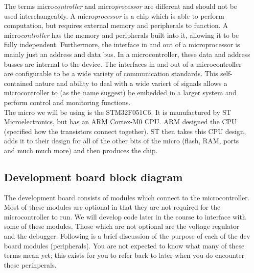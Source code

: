 \begin{table}
\caption{Comparison of specs of entry level computer to STM32F051C6.}
\label{table:specs_comp}
\end{table}

The terms micro\textit{controller} and micro\textit{processor} are different and should not be used interchangeably. A micro\textit{processor} is a chip which is able to perform computation, but requires external memory and peripherals to function. A micro\textit{controller} has the memory and peripherals built into it, allowing it to be fully independent. Furthermore, the interface in and out of a microprocessor is mainly just an address and data bus. In a microcontroller, these data and address busses are internal to the device. The interfaces in and out of a microcontroller are configurable to be a wide variety of communication standards. This self-contained nature and ability to deal with a wide variert of signals allows a microcontroller to (as the name suggest) be embedded in a larger system and perform control and monitoring functions.\\

The micro we will be using is the STM32F051C6. It is manufactured by ST Microelectronics, but has an ARM Cortex-M0 CPU. ARM designed the CPU (specified how the transistors connect together). ST then takes this CPU design, adds it to their design for all of the other bits of the micro (flash, RAM, ports and much much more) and then produces the chip.

\subsection{Development board block diagram}
The development board consists of modules which connect to the microcontroller. Most of these modules are optional in that they are not required for the microcontroller to run. We will develop code later in the course to interface with some of these modules. Those which are not optional are the voltage regulator and the debugger.
Following is a brief discussion of the purpose of each of the dev board modules (peripherals). You are not expected to know what many of these terms mean yet; this exists for you to refer back to later when you do encounter these perihperals. 

